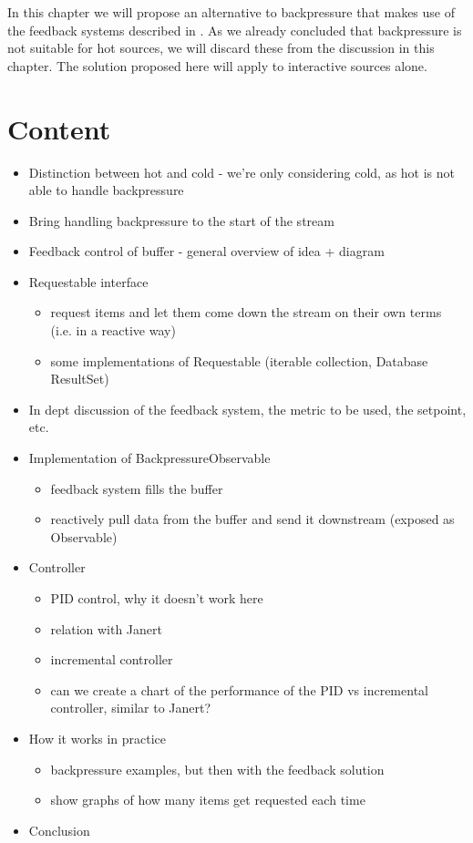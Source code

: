 In this chapter we will propose an alternative to backpressure that makes use of the feedback systems described in . As we already concluded that backpressure is not suitable for hot sources, we will discard these from the discussion in this chapter. The solution proposed here will apply to interactive sources alone.



\clearpage
\section*{Content}
\begin{itemize}
	\item[\checkmark] Distinction between hot and cold - we're only considering cold, as hot is not able to handle backpressure
	\item[\checkmark] Bring handling backpressure to the start of the stream
	\item[\checkmark] Feedback control of buffer - general overview of idea + diagram
	\item[\checkmark] Requestable interface
		\begin{itemize}
			\item[\checkmark] request items and let them come down the stream on their own terms (i.e. in a reactive way)
			\item[\checkmark] some implementations of Requestable (iterable collection, Database ResultSet)
		\end{itemize}
	\item[\checkmark] In dept discussion of the feedback system, the metric to be used, the setpoint, etc.
	\item[\checkmark] Implementation of BackpressureObservable
		\begin{itemize}
			\item[\checkmark] feedback system fills the buffer
			\item[\checkmark] reactively pull data from the buffer and send it downstream (exposed as Observable)
		\end{itemize}
	\item Controller
		\begin{itemize}
			\item PID control, why it doesn't work here
			\item relation with Janert
			\item incremental controller
			\item can we create a chart of the performance of the PID vs incremental controller, similar to Janert?
		\end{itemize}
	\item How it works in practice
		\begin{itemize}
			\item backpressure examples, but then with the feedback solution
			\item show graphs of how many items get requested each time
		\end{itemize}
	\item Conclusion
\end{itemize}